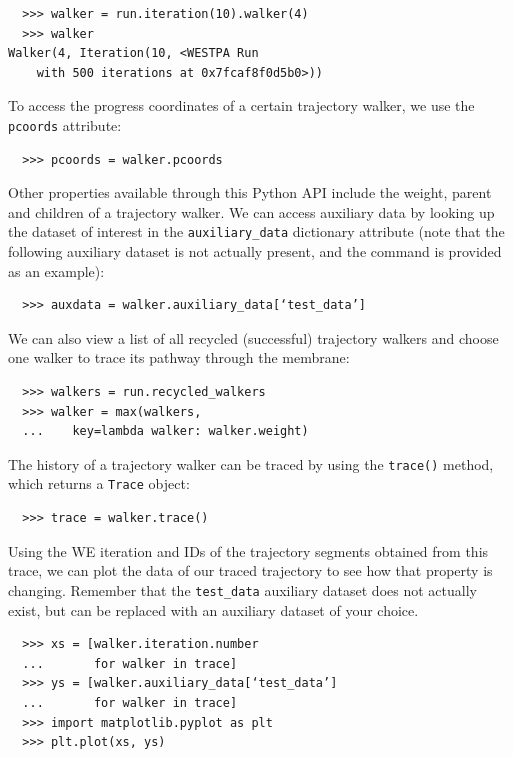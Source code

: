 \begin{verbatim}
  >>> walker = run.iteration(10).walker(4)
  >>> walker
Walker(4, Iteration(10, <WESTPA Run
    with 500 iterations at 0x7fcaf8f0d5b0>))
\end{verbatim}

To access the progress coordinates of a certain trajectory walker, we use the \verb|pcoords| attribute:

\begin{verbatim}
  >>> pcoords = walker.pcoords
\end{verbatim}

Other properties available through this Python API include the weight, parent and children of a trajectory walker.
We can access auxiliary data by looking up the dataset of interest in the \verb|auxiliary_data| dictionary attribute (note that the following auxiliary dataset is not actually present, and the command is provided as an example):

\begin{verbatim}
  >>> auxdata = walker.auxiliary_data[‘test_data’]
\end{verbatim}

We can also view a list of all recycled (successful) trajectory walkers and choose one walker to trace its pathway through the membrane:

\begin{verbatim}
  >>> walkers = run.recycled_walkers
  >>> walker = max(walkers, 
  ...    key=lambda walker: walker.weight)
\end{verbatim}

The history of a trajectory walker can be traced by using the \verb|trace()| method, which returns a \verb|Trace| object:

\begin{verbatim}
  >>> trace = walker.trace()
\end{verbatim}

Using the WE iteration and IDs of the trajectory segments obtained from this trace, we can plot the data of our traced trajectory to see how that property is changing.
Remember that the \verb|test_data| auxiliary dataset does not actually exist, but can be replaced with an auxiliary dataset of your choice.

\begin{verbatim}
  >>> xs = [walker.iteration.number 
  ...       for walker in trace]
  >>> ys = [walker.auxiliary_data[‘test_data’] 
  ...       for walker in trace]
  >>> import matplotlib.pyplot as plt
  >>> plt.plot(xs, ys)
\end{verbatim}

